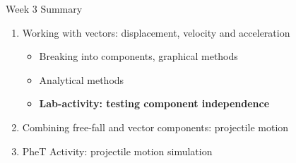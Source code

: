 \documentclass{beamer}
\begin{document}
\begin{frame}{Week 3 Summary}
\begin{enumerate}
\item Working with vectors: displacement, velocity and acceleration
\begin{itemize}
\item Breaking into components, graphical methods
\item Analytical methods
\item \textbf{Lab-activity: testing component independence}
\end{itemize}
\item Combining free-fall and vector components: \alert{projectile motion}
\item PheT Activity: projectile motion simulation
\end{enumerate}
\end{frame}
\end{document}
